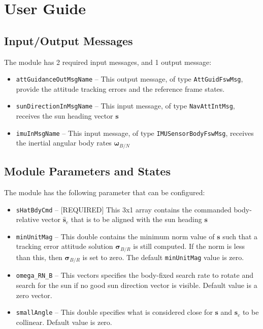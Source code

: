 
\section{User Guide}
\subsection{Input/Output Messages}
The module has 2 required input messages, and 1 output message:
\begin{itemize}
	\item {\tt attGuidanceOutMsgName} -- This output message, of type {\tt AttGuidFswMsg}, provide the attitude tracking errors and the reference frame states.
	\item {\tt sunDirectionInMsgName} -- This input message, of type {\tt NavAttIntMsg}, receives the sun heading vector $\bm s$
	\item {\tt imuInMsgName} -- This input message, of type {\tt IMUSensorBodyFswMsg}, receives the inertial angular body rates $\bm \omega_{B/N}$
\end{itemize}

\subsection{Module Parameters and States}
The module has the following parameter that can be configured:
\begin{itemize}
	\item {\tt sHatBdyCmd} -- [REQUIRED] This 3x1 array contains the commanded body-relative vector $\hat{\bm s}_{c}$ that is to be aligned with the sun heading $\bm s$
	
	\item {\tt minUnitMag} -- This double contains the minimum norm value of $\bm s$ such that a tracking error attitude solution $\bm\sigma_{B/R}$ is still computed.  If the norm is less than this, then $\bm\sigma_{B/R}$ is set to zero.    The default {\tt minUnitMag} value is zero. 
	
	\item {\tt omega\_RN\_B} -- This vectors specifies the body-fixed search rate to rotate and search for the sun if no good sun direction vector is visible.  Default value is a zero vector.  

	\item {\tt smallAngle} -- This double specifies what is considered close for $\bm s$ and $\hat{\bm s}_{c}$ to be collinear.  Default value is zero.  
	
\end{itemize}

